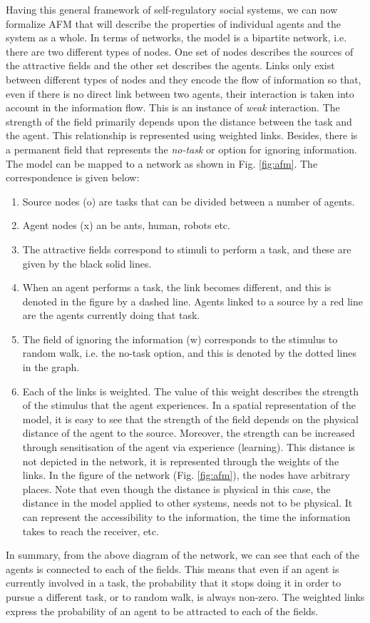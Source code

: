\documentclass[final,5p,times,twocolumn]{elsarticle}
\begin{document}
Having this general framework of self-regulatory social systems, we can now formalize AFM that will describe the properties of individual  agents and the system as a whole. In terms of networks, the model is a bipartite network, i.e. there are two different types of nodes. One set of nodes describes the sources of the attractive fields and the other set describes the agents. Links only exist between different types of nodes and they encode the flow of information so that, even if there is no direct link between two agents, their interaction is taken into account in the information flow. This is an instance of {\em weak} interaction. The strength of the field primarily depends upon the distance between the task and the agent. This relationship is represented using weighted links. Besides, there is a permanent field that represents the {\em no-task} or  option for ignoring information. The model can be mapped to a network as shown in Fig. \ref{fig:afm}. The correspondence is given below:
\begin{enumerate}
\item Source nodes (o) are tasks that can be divided between a number of agents.
\item Agent nodes (x) an be ants, human,  robots etc.
\item The attractive fields correspond to stimuli to perform a task, and these are given by the black solid lines.
\item When an agent performs a task, the link becomes different, and this is denoted in the figure by a dashed line. Agents linked to a source by a red line are the agents currently doing that task. 
\item The field of ignoring the information (w) corresponds to the stimulus to random walk, i.e. the no-task option, and this is denoted by the dotted lines in the graph. 
\item Each of the links is weighted. The value of this weight describes the strength of the stimulus that the agent experiences. In a spatial representation of the model, it is easy to see that the strength of the field depends on the physical distance of the agent to the source. Moreover, the strength can be increased through sensitisation of the agent via experience (learning). This distance is not depicted in the network, it is represented through the weights of the links. In the figure of the network (Fig. \ref{fig:afm}), the nodes have arbitrary places. Note that even though the distance is physical in this case, the distance in the model applied to other systems, needs not to be physical. It can represent the accessibility to the information, the time the information takes to reach the receiver, etc. 
\end{enumerate}
In summary, from the above diagram of the network, we can see that each of the agents is connected to each of the fields. This means that even if an agent is currently involved in a task, the probability that it stops doing it in order to pursue a different task, or to random walk, is always non-zero. The weighted links express the probability of an agent to be attracted to each of the fields.
\end{document}
